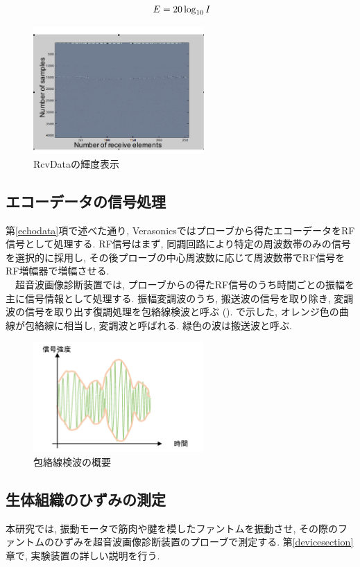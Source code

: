 \begin{equation}
\label{eq.deci}
\\\ E =20 \log_{10} I
\end{equation}
\begin{figure}[h]
  \begin{center}
    \includegraphics[width=65mm]{fig/RcvData_light.pdf}
  \end{center}
  \caption{RcvDataの輝度表示}
\end{figure}
\subsection{エコーデータの信号処理}
第\ref{echodata}項で述べた通り, Verasonicsではプローブから得たエコーデータをRF信号として処理する. RF信号はまず, 同調回路により特定の周波数帯のみの信号を選択的に採用し, その後プローブの中心周波数に応じて周波数帯でRF信号をRF増幅器で増幅させる. 
\\\ \ 超音波画像診断装置では, プローブからの得たRF信号のうち時間ごとの振幅を主に信号情報として処理する. 振幅変調波のうち, 搬送波の信号を取り除き, 変調波の信号を取り出す復調処理を包絡線検波と呼ぶ %
(). で示した, オレンジ色の曲線が包絡線に相当し, 変調波と呼ばれる. 緑色の波は搬送波と呼ぶ. 
\begin{figure}[h]
  \begin{center}
    \includegraphics[width=65mm]{fig/hourakusen.pdf}
  \end{center}
  \caption{包絡線検波の概要}
\end{figure}
\subsection{生体組織のひずみの測定}
本研究では, 振動モータで筋肉や腱を模したファントムを振動させ, その際のファントムのひずみを超音波画像診断装置のプローブで測定する. 第\ref{devicesection}章で, 実験装置の詳しい説明を行う. 